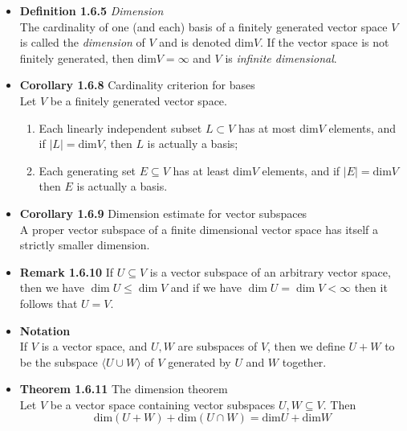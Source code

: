 \documentclass[11pt,a4paper]{article}
\begin{document}
\begin{itemize}
    \item \textbf{Definition 1.6.5} \emph{Dimension} \\
        The cardinality of one (and each) basis of a finitely generated vector space $V$
        is called the \emph{dimension} of $V$ and is denoted $\text{dim}V$.
        If the vector space is not finitely generated, then $\text{dim}V = \infty$
        and $V$ is \emph{infinite dimensional}.

    \item \textbf{Corollary 1.6.8} Cardinality criterion for bases \\
        Let $V$ be a finitely generated vector space.
        \begin{enumerate}
            \item Each linearly independent subset $L \subset V$ has at most dim$V$
                elements,
                and if $|L| = \text{dim}V$, then $L$ is actually a basis;
            \item Each generating set $E \subseteq V$ has at least dim$V$ elements,
                and if $|E| = \text{dim}V$ then $E$ is actually a basis.
        \end{enumerate}

    \item \textbf{Corollary 1.6.9} Dimension estimate for vector subspaces \\
        A proper vector subspace of a finite dimensional vector space has itself a strictly
        smaller dimension.

    \item \textbf{Remark 1.6.10}
        If $U \subseteq V$ is a vector subspace of an arbitrary vector space,
        then we have $\dim U \leq \dim V$ and if we have $\dim U = \dim V < \infty$
        then it follows that $U = V$.

    \item \textbf{Notation} \\
        If $V$ is a vector space, and $U, W$ are subspaces of $V$, then we define $U+W$
        to be the subspace $\langle U \cup W \rangle$ of $V$ generated by $U$ and $W$
        together.

    \item \textbf{Theorem 1.6.11} The dimension theorem \\
        Let $V$ be a vector space containing vector subspaces $U, W \subseteq V$.  Then
        \[
            \text{dim}(U+W) + \text{dim}(U \cap W) = \text{dim}U + \text{dim}W
        \]

\end{itemize}
\end{document}
